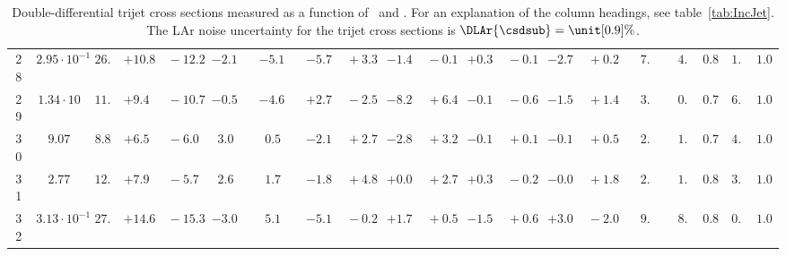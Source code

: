 \documentclass[12pt]{article}
\renewcommand{\arraystretch}{1.25} %
\begin{document}
\begin{table}
\begin{tabular}{ccrr@{\hskip0pt}rrc@{\hskip0pt}r@{\hskip0pt}c@{\hskip0pt}r@{\hskip0pt}rr@{\hskip0pt}rr@{\hskip0pt}rr@{\hskip0pt}rr@{\hskip0pt}r@{\hskip0pt}r@{\hskip0pt}c|rr|r}
28 &$2.95 \cdot 10^{-1}$ &$26.7$  & ${+10.8~}$&${~-12.2}$ & $-2.1$  & &$-5.1$&&${-5.7~}$&${~+3.3}$ & ${-1.4~}$&${~-0.1}$ & ${+0.3~}$&${~-0.1}$ & ${-2.7~}$&${~+0.2}$ & &$ 7.4$&&$ 4.0$  & $0.83$  & $ 1.5$  & $1.08$   \\ 
29 &$1.34 \cdot 10$ &$11.0$  & ${+9.4~}$&${~-10.7}$ & $-0.5$  & &$-4.6$&&${+2.7~}$&${~-2.5}$ & ${-8.2~}$&${~+6.4}$ & ${-0.1~}$&${~-0.6}$ & ${-1.5~}$&${~+1.4}$ & &$ 3.0$&&$ 0.7$  & $0.73$  & $ 6.1$  & $1.04$   \\ 
30 &$9.07$ &$ 8.8$  & ${+6.5~}$&${~-6.0}$ & $ 3.0$  & &$ 0.5$&&${-2.1~}$&${~+2.7}$ & ${-2.8~}$&${~+3.2}$ & ${-0.1~}$&${~+0.1}$ & ${-0.1~}$&${~+0.5}$ & &$ 2.2$&&$ 1.4$  & $0.78$  & $ 4.8$  & $1.03$   \\ 
31 &$2.77$ &$12.0$  & ${+7.9~}$&${~-5.7}$ & $ 2.6$  & &$ 1.7$&&${-1.8~}$&${~+4.8}$ & ${+0.0~}$&${~+2.7}$ & ${+0.3~}$&${~-0.2}$ & ${-0.0~}$&${~+1.8}$ & &$ 2.9$&&$ 1.6$  & $0.83$  & $ 3.2$  & $1.04$   \\ 
32 &$3.13 \cdot 10^{-1}$ &$27.5$  & ${+14.6~}$&${~-15.3}$ & $-3.0$  & &$ 5.1$&&${-5.1~}$&${~-0.2}$ & ${+1.7~}$&${~+0.5}$ & ${-1.5~}$&${~+0.6}$ & ${+3.0~}$&${~-2.0}$ & &$ 9.8$&&$ 8.4$  & $0.84$  & $ 0.8$  & $1.06$   \\ 
\hline
\hline
\end{tabular}

    \caption{
      Double-differential trijet cross sections measured as a function of \Qsq\ and \meanpttri. 
      For an explanation of the column headings, see table~\ref{tab:IncJet}.
      The LAr noise uncertainty for the trijet cross sections is $\DLAr{\csdsub} = \unit[0.9]{\%}$.
  }
  \label{tab:Trijet}
\renewcommand{\arraystretch}{1.3} %

\end{table}
\end{document}
